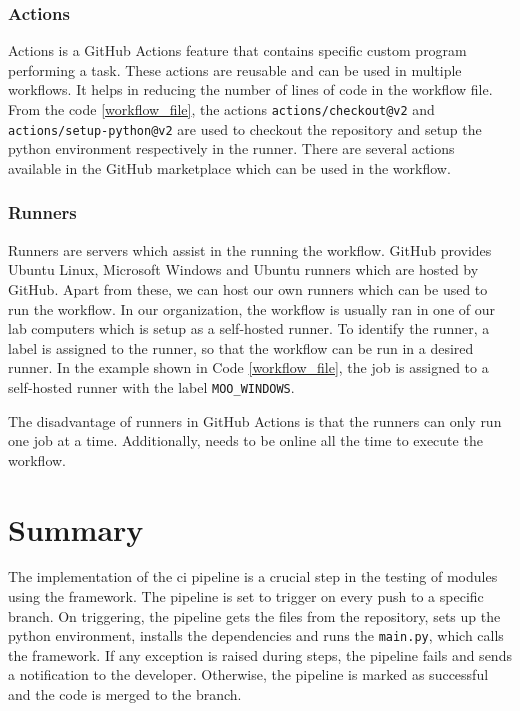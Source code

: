 \subsubsection{Actions}
Actions is a GitHub Actions feature that contains specific custom program performing a task. These actions are reusable and can be used in multiple workflows.
It helps in reducing the number of lines of code in the workflow file. From the code \ref{workflow_file}, the actions \texttt{actions/checkout@v2} and 
\texttt{actions/setup-python@v2} are used to checkout the repository and setup the python environment respectively in the runner. There are several actions 
available in the GitHub marketplace which can be used in the workflow.

\subsubsection{Runners}
Runners are servers which assist in the running the workflow. GitHub provides Ubuntu Linux, Microsoft Windows and Ubuntu runners which are hosted by GitHub.
Apart from these, we can host our own runners which can be used to run the workflow. In our organization, the workflow is usually ran in one of our lab computers
which is setup as a self-hosted runner. To identify the runner, a label is assigned to the runner, so that the workflow can be run in a desired runner. 
In the example shown in Code \ref{workflow_file}, the job is assigned to a self-hosted runner with the label \texttt{MOO\_WINDOWS}. 

The disadvantage of runners in GitHub Actions is that the runners can only run one job at a time. Additionally, needs to be online all the time to execute the 
workflow. 

\section{Summary}
The implementation of the \acrshort{ci} pipeline is a crucial step in the testing of modules using the framework. The pipeline is set to trigger on every push to
a specific branch. On triggering, the pipeline gets the files from the repository, sets up the python environment, installs the dependencies and runs the 
\texttt{main.py}, which calls the framework. If any exception is raised during steps, the pipeline fails and sends a notification to the developer. Otherwise,
the pipeline is marked as successful and the code is merged to the branch.